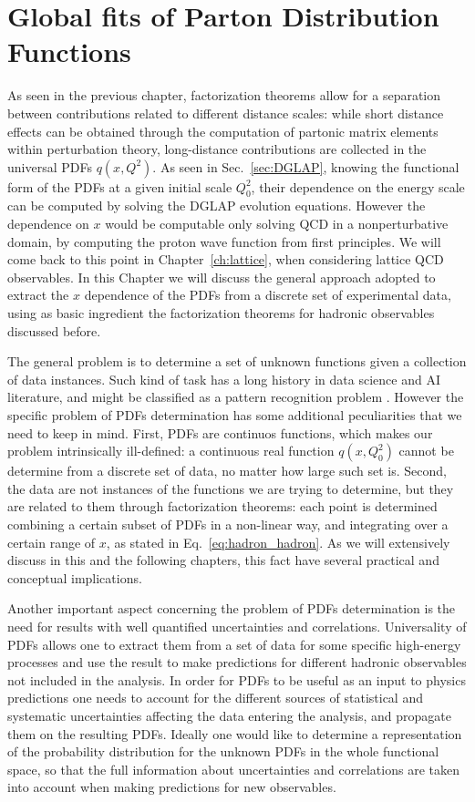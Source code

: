 \chapter{Global fits of Parton Distribution Functions} 
\label{ch:nnpdf_methodology}
As seen in the previous chapter, factorization theorems allow for a separation between contributions 
related to different distance scales: while short distance
effects can be obtained through the computation of partonic matrix elements within perturbation theory, 
long-distance contributions are collected in the universal PDFs $q\left(x,Q^2\right)$. As seen in Sec.~\ref{sec:DGLAP},
knowing the functional form of the PDFs at a given initial scale $Q_0^2$, 
their dependence on the energy scale can be computed by solving the DGLAP evolution equations.
However the dependence on $x$ would be computable only solving QCD in a nonperturbative domain, 
by computing the proton wave function from first principles. We will come back to 
this point in Chapter~\ref{ch:lattice}, when considering lattice QCD observables.
In this Chapter we will discuss the general approach adopted to extract the $x$ dependence of the PDFs
from a discrete set of experimental data, using as basic ingredient the factorization theorems for hadronic observables
discussed before.

%
The general problem is to determine a set of unknown functions given
a collection of data instances. Such kind of task has a long history in data science and AI literature, 
and might be classified as a pattern recognition problem \cite{Forte:2020yip}.
However the specific problem of PDFs determination has some additional peculiarities that we need to keep in mind.
First, PDFs are continuos functions, which makes our problem intrinsically ill-defined: a continuous real function
$q\left(x,Q_0^2\right)$ cannot be determine from a discrete set of data, no matter how large such set is.
Second, the data are not instances of the functions we are trying to determine, but they are related to 
them through factorization theorems: each point is determined combining a certain subset of PDFs in a non-linear way,
and integrating over a certain range of $x$, as stated in Eq.~\eqref{eq:hadron_hadron}. 
As we will extensively discuss in this and the following chapters,
this fact have several practical and conceptual implications.

%
Another important aspect concerning the problem of PDFs determination 
is the need for results with well quantified uncertainties and correlations.
Universality of PDFs allows one to extract them from a set of data for some specific high-energy processes
and use the result to make predictions for different hadronic observables not included in the analysis.
In order for PDFs to be useful as an input to physics predictions one needs to account for the different
sources of statistical and systematic uncertainties affecting the data entering the analysis, and
propagate them on the resulting PDFs.
Ideally one would like to determine a representation 
of the probability distribution for the unknown PDFs in the whole functional space, so that the full information
about uncertainties and correlations are taken into account when making predictions for new observables.

